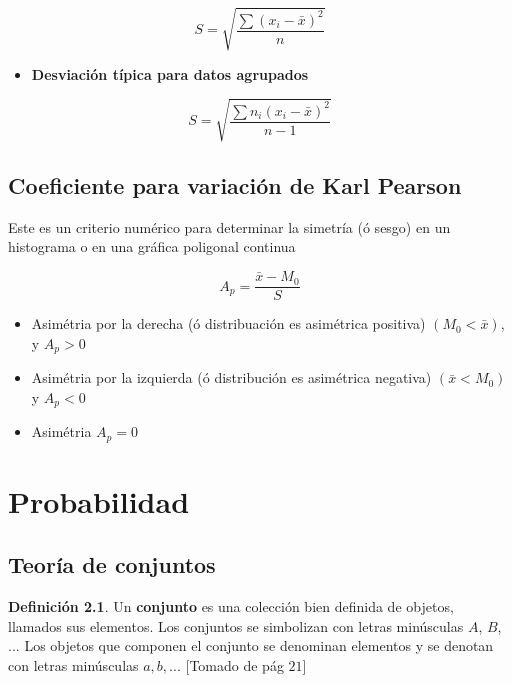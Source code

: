 \documentclass[
]{book}
\providecommand{\tightlist}{%
  \setlength{\itemsep}{0pt}\setlength{\parskip}{0pt}}
\theoremstyle{definition}
\newtheorem{definition}{Definición}[chapter]
\theoremstyle{definition}
\theoremstyle{definition}
\theoremstyle{definition}
\theoremstyle{remark}
\begin{document}
\[
S=\sqrt{\dfrac{\sum ( x_{i}-\bar{x})^{2}}{n}}
\]

\begin{itemize}
\tightlist
\item
  \textbf{Desviación típica para datos agrupados}
\end{itemize}

\[
S=\sqrt{\dfrac{\sum n_{i}( x_{i}-\bar{x})^{2}}{n-1}}
\]

\hypertarget{coeficiente-para-variaciuxf3n-de-karl-pearson}{%
\section{Coeficiente para variación de Karl Pearson}\label{coeficiente-para-variaciuxf3n-de-karl-pearson}}

Este es un criterio numérico para determinar la simetría (ó sesgo) en un histograma o en
una gráfica poligonal continua

\[
A_{p}=\dfrac{\bar{x}-M_{0}}{S}
\]

\begin{itemize}
\item
  Asimétria por la derecha (ó distribuación es asimétrica positiva) \((M_{0}<\bar{x})\), y \(A_{p}>0\)
\item
  Asimétria por la izquierda (ó distribución es asimétrica negativa) \((\bar{x}<M_{0})\) y \(A_{p}<0\)
\item
  Asimétria \(A_{p}=0\)
\end{itemize}

\hypertarget{probabilidad}{%
\chapter{Probabilidad}\label{probabilidad}}

\hypertarget{teoruxeda-de-conjuntos}{%
\section{Teoría de conjuntos}\label{teoruxeda-de-conjuntos}}

\begin{definition}
\protect\hypertarget{def:unnamed-chunk-19}{}{\label{def:unnamed-chunk-19} }Un \textbf{conjunto} es una colección bien definida de objetos, llamados sus elementos. Los conjuntos se simbolizan con letras minúsculas \(A\), \(B\), \(...\) Los objetos que componen el conjunto se denominan elementos y se denotan con letras minúsculas \(a, b, ...\) {[}Tomado de \citep{zill2012algebra} pág \(21\){]}
\end{definition}
\end{document}
